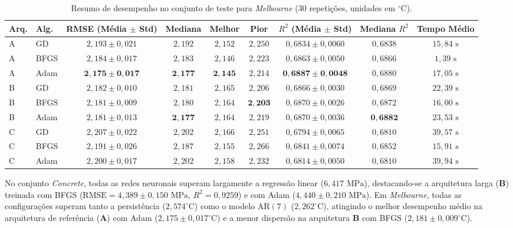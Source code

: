 \documentclass[conference]{IEEEtran}
\begin{document}
\begin{table}[htbp]
\caption{Resumo de desempenho no conjunto de teste para \textit{Melbourne} ($30$ repetições, unidades em $^{\circ}\text{C}$).}
\label{tab:res_melbourne}
\centering
\scriptsize
\begin{tabular}{@{}llccccccc@{}}
\toprule
\textbf{Arq.} & \textbf{Alg.} & \textbf{RMSE (Média $\pm$ Std)} & \textbf{Mediana} & \textbf{Melhor} & \textbf{Pior} & \textbf{$R^2$ (Média $\pm$ Std)} & \textbf{Mediana $R^2$} & \textbf{Tempo Médio} \\
\midrule
A & GD   & $2{,}193 \pm 0{,}021$ & $2{,}192$ & $2{,}152$ & $2{,}250$ & $0{,}6834 \pm 0{,}0060$ & $0{,}6838$ & $15{,}84\text{ s}$ \\
A & BFGS & $2{,}184 \pm 0{,}017$ & $2{,}183$ & $2{,}146$ & $2{,}223$ & $0{,}6863 \pm 0{,}0050$ & $0{,}6866$ & $1{,}39\text{ s}$ \\
A & Adam & $\mathbf{2{,}175 \pm 0{,}017}$ & $\mathbf{2{,}177}$ & $\mathbf{2{,}145}$ & $2{,}214$ & $\mathbf{0{,}6887 \pm 0{,}0048}$ & $0{,}6880$ & $17{,}05\text{ s}$ \\
\midrule
B & GD   & $2{,}182 \pm 0{,}010$ & $2{,}181$ & $2{,}165$ & $2{,}206$ & $0{,}6866 \pm 0{,}0030$ & $0{,}6869$ & $22{,}39\text{ s}$ \\
B & BFGS & $2{,}181 \pm 0{,}009$ & $2{,}180$ & $2{,}164$ & $\mathbf{2{,}203}$ & $0{,}6870 \pm 0{,}0026$ & $0{,}6872$ & $16{,}00\text{ s}$ \\
B & Adam & $2{,}181 \pm 0{,}013$ & $\mathbf{2{,}177}$ & $2{,}164$ & $2{,}219$ & $0{,}6870 \pm 0{,}0036$ & $\mathbf{0{,}6882}$ & $23{,}53\text{ s}$ \\
\midrule
C & GD   & $2{,}207 \pm 0{,}022$ & $2{,}202$ & $2{,}166$ & $2{,}251$ & $0{,}6794 \pm 0{,}0065$ & $0{,}6810$ & $39{,}57\text{ s}$ \\
C & BFGS & $2{,}191 \pm 0{,}026$ & $2{,}187$ & $2{,}155$ & $2{,}266$ & $0{,}6841 \pm 0{,}0074$ & $0{,}6852$ & $15{,}91\text{ s}$ \\
C & Adam & $2{,}200 \pm 0{,}017$ & $2{,}202$ & $2{,}158$ & $2{,}232$ & $0{,}6814 \pm 0{,}0050$ & $0{,}6810$ & $39{,}94\text{ s}$ \\
\bottomrule
\end{tabular}
\end{table}

No conjunto \textit{Concrete}, todas as redes neuronais superam largamente a regressão linear ($6{,}417\text{ MPa}$), destacando-se a arquitetura larga (\textbf{B}) treinada com BFGS ($\text{RMSE} = 4{,}389 \pm 0{,}150\text{ MPa}$, $R^2 = 0{,}9259$) e com Adam ($4{,}440 \pm 0{,}210\text{ MPa}$). Em \textit{Melbourne}, todas as configurações superam tanto a persistência ($2{,}574^{\circ}\text{C}$) como o modelo $\text{AR}(7)$ ($2{,}262^{\circ}\text{C}$), atingindo o melhor desempenho médio na arquitetura de referência (\textbf{A}) com Adam ($2{,}175 \pm 0{,}017^{\circ}\text{C}$) e a menor dispersão na arquitetura \textbf{B} com BFGS ($2{,}181 \pm 0{,}009^{\circ}\text{C}$).
\end{document}
